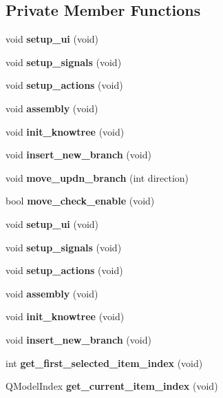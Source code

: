 \subsection*{Private Member Functions}
\begin{CompactItemize}
\item 
void {\bf setup\_\-ui} (void)
\item 
void {\bf setup\_\-signals} (void)
\item 
void {\bf setup\_\-actions} (void)
\item 
void {\bf assembly} (void)
\item 
void {\bf init\_\-knowtree} (void)
\item 
void {\bf insert\_\-new\_\-branch} (void)
\item 
void {\bf move\_\-updn\_\-branch} (int direction)
\item 
bool {\bf move\_\-check\_\-enable} (void)
\item 
void {\bf setup\_\-ui} (void)
\item 
void {\bf setup\_\-signals} (void)
\item 
void {\bf setup\_\-actions} (void)
\item 
void {\bf assembly} (void)
\item 
void {\bf init\_\-knowtree} (void)
\item 
void {\bf insert\_\-new\_\-branch} (void)
\item 
int {\bf get\_\-first\_\-selected\_\-item\_\-index} (void)
\item 
QModel\-Index {\bf get\_\-current\_\-item\_\-index} (void)
\end{CompactItemize}
